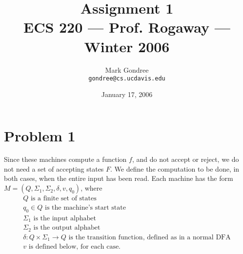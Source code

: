 \documentclass[11pt]{article}
\title{\textbf{Assignment 1}\\[2ex] \normalsize{ECS 220 --- Prof. Rogaway --- Winter 2006}}
\date{January 17, 2006}
\author{\begin{tabular}{c}
    Mark Gondree \\
    {\small \texttt{gondree@cs.ucdavis.edu}}
\end{tabular}}
\begin{document}
\maketitle

\section*{Problem 1} Since these machines compute a function $f$, and do not accept or reject, we do not need a set of accepting states $F$. We define the computation to be done, in both cases, when the entire input has been read. Each machine has the form $M = (Q, \Sigma_1, \Sigma_2, \delta, v, q_0)$, where
$$\begin{array}{l}
Q \textrm{ is a finite set of states} \\
q_0 \in Q \textrm{ is the machine's start state} \\
\Sigma_1 \textrm{ is the input alphabet} \\
\Sigma_2 \textrm{ is the output alphabet} \\
\delta: Q \times \Sigma_1 \to Q \textrm{ is the transition function, defined as in a normal DFA} \\
v \textrm{ is defined below, for each case.}
\end{array}$$
\end{document}
